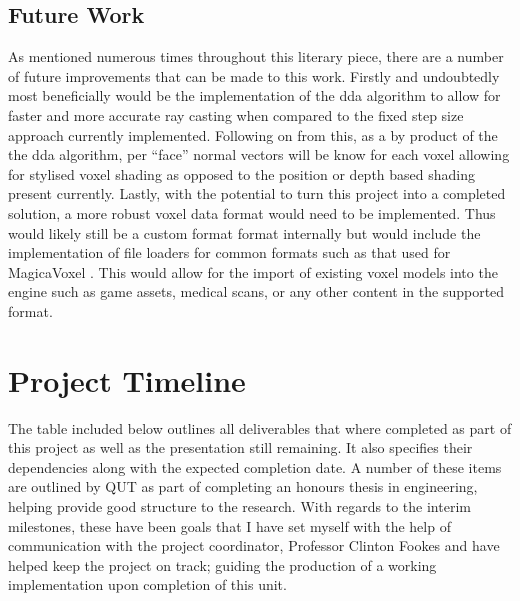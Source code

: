 \documentclass[titlepage]{article}
\begin{document}
\subsection{Future Work}

As mentioned numerous times throughout this literary piece, there are a number of future improvements that can be made to this work. Firstly and undoubtedly most beneficially would be the implementation of the \gls{dda} algorithm to allow for faster and more accurate ray casting when compared to the fixed step size approach currently implemented. Following on from this, as a by product of the the \gls{dda} algorithm, per ``face'' normal vectors will be know for each voxel allowing for stylised voxel shading as opposed to the position or depth based shading present currently. Lastly, with the potential to turn this project into a completed solution, a more robust voxel data format would need to be implemented. Thus would likely still be a custom format format internally but would include the implementation of file loaders for common formats such as that used for MagicaVoxel \cite{magicavoxel}. This would allow for the import of existing voxel models into the engine such as game assets, medical scans, or any other content in the supported format.

\appendix

\section{Project Timeline}

The table included below outlines all deliverables that where completed as part of this project as well as the presentation still remaining. It also specifies their dependencies along with the expected completion date. A number of these items are outlined by QUT as part of completing an honours thesis in engineering, helping provide good structure to the research. With regards to the interim milestones, these have been goals that I have set myself with the help of communication with the project coordinator, Professor Clinton Fookes and have helped keep the project on track; guiding the production of a working implementation upon completion of this unit.
\end{document}
